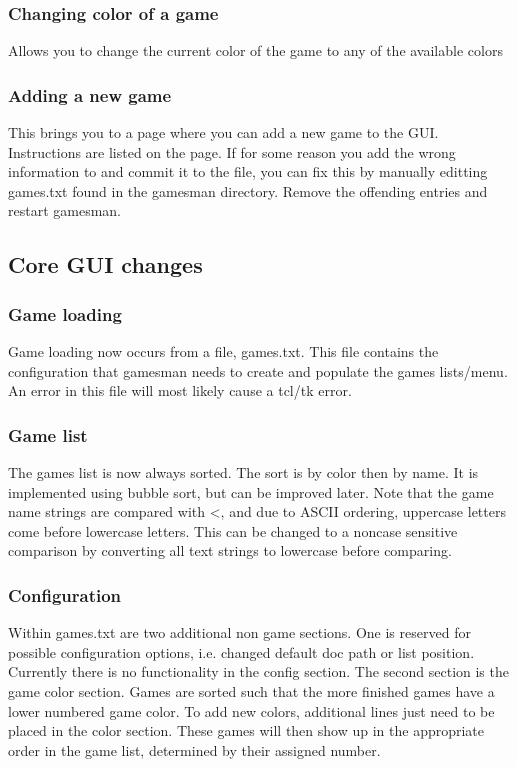 \documentclass[11pt]{article}
\begin{document}
\subsubsection{Changing color of a game}
Allows you to change the current color of the game to any of the available colors
\subsubsection{Adding a new game}
This brings you to a page where you can add a new game to the GUI. Instructions are listed on the page. If for some reason you add the wrong information to and commit it to the file, you can fix this by manually editting games.txt found in the gamesman directory. Remove the offending entries and restart gamesman.

\subsection{Core GUI changes}
\subsubsection{Game loading}
Game loading now occurs from a file, games.txt. This file contains the configuration that gamesman needs to create and populate the games lists/menu. An error in this file will most likely cause a tcl/tk error.
\subsubsection{Game list}
The games list is now always sorted. The sort is by color then by name. It is implemented using bubble sort, but can be improved later. Note that the game name strings are compared with \textless, and due to ASCII ordering, uppercase letters come before lowercase letters. This can be changed to a noncase sensitive comparison by converting all text strings to lowercase before comparing.

\subsubsection{Configuration}
Within games.txt are two additional non game sections. One is reserved for possible configuration options, i.e. changed default doc path or list position. Currently there is no functionality in the config section. The second section is the game color section. Games are sorted such that the more finished games have a lower numbered game color. To add new colors, additional lines just need to be placed in the color section. These games will then show up in the appropriate order in the game list, determined by their assigned number. 
\end{document}
